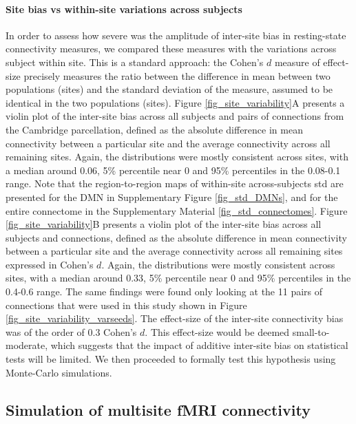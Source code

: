 \documentclass[authoryear]{elsarticle}
\begin{document}
\paragraph{Site bias vs within-site variations across subjects} In order to assess how severe was the amplitude of inter-site bias in resting-state connectivity measures, we compared these measures with the variations across subject within site. This is a standard approach: the Cohen's $d$ measure of effect-size \citep{Cohen1992} precisely measures the ratio between the difference in mean between two populations (sites) and the standard deviation of the measure, assumed to be identical in the two populations (sites). Figure \ref{fig_site_variability}A presents a violin plot of the inter-site bias across all subjects and pairs of connections from the Cambridge parcellation, defined as the absolute difference in mean connectivity between a particular site and the average connectivity across all remaining sites. Again, the distributions were mostly consistent across sites, with a median around 0.06, 5\% percentile near 0 and 95\% percentiles in the 0.08-0.1 range. Note that the region-to-region maps of within-site across-subjects std are presented for the DMN in Supplementary Figure \ref{fig_std_DMNs}, and for the entire connectome in the Supplementary Material \ref{fig_std_connectomes}. Figure \ref{fig_site_variability}B presents a violin plot of the inter-site bias across all subjects and connections, defined as the absolute difference in mean connectivity between a particular site and the average connectivity across all remaining sites expressed in Cohen's $d$. Again, the distributions were mostly consistent across sites, with a median around 0.33, 5\% percentile near 0 and 95\% percentiles in the 0.4-0.6 range. The same findings were found only looking at the 11 pairs of connections that were used in this study shown in Figure \ref{fig_site_variability_varseeds}. The effect-size of the inter-site connectivity bias was of the order of 0.3 Cohen's $d$. This effect-size would be deemed small-to-moderate, which suggests that the impact of additive inter-site bias on statistical tests will be limited. We then proceeded to formally test this hypothesis using Monte-Carlo simulations. 

\subsection{Simulation of multisite fMRI connectivity}
\end{document}
